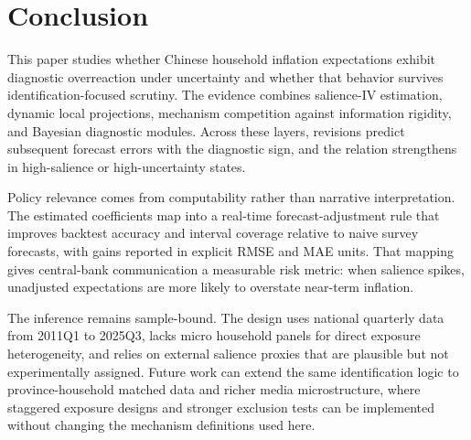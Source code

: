 ﻿\section{Conclusion}

This paper studies whether Chinese household inflation expectations exhibit diagnostic overreaction under uncertainty and whether that behavior survives identification-focused scrutiny. The evidence combines salience-IV estimation, dynamic local projections, mechanism competition against information rigidity, and Bayesian diagnostic modules. Across these layers, revisions predict subsequent forecast errors with the diagnostic sign, and the relation strengthens in high-salience or high-uncertainty states.

Policy relevance comes from computability rather than narrative interpretation. The estimated coefficients map into a real-time forecast-adjustment rule that improves backtest accuracy and interval coverage relative to naive survey forecasts, with gains reported in explicit RMSE and MAE units. That mapping gives central-bank communication a measurable risk metric: when salience spikes, unadjusted expectations are more likely to overstate near-term inflation.

The inference remains sample-bound. The design uses national quarterly data from 2011Q1 to 2025Q3, lacks micro household panels for direct exposure heterogeneity, and relies on external salience proxies that are plausible but not experimentally assigned. Future work can extend the same identification logic to province-household matched data and richer media microstructure, where staggered exposure designs and stronger exclusion tests can be implemented without changing the mechanism definitions used here.
